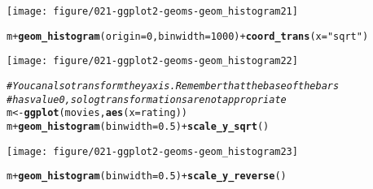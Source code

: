 \documentclass[a4paper,titlepage]{tufte-handout}\usepackage[]{graphicx}\usepackage[]{color}
\makeatletter
\def\maxwidth{ %
  \ifdim\Gin@nat@width>\linewidth
    \linewidth
  \else
    \Gin@nat@width
  \fi
}
\newcommand{\hlnum}[1]{\textcolor[rgb]{0.686,0.059,0.569}{#1}}%
\newcommand{\hlstr}[1]{\textcolor[rgb]{0.192,0.494,0.8}{#1}}%
\newcommand{\hlcom}[1]{\textcolor[rgb]{0.678,0.584,0.686}{\textit{#1}}}%
\newcommand{\hlopt}[1]{\textcolor[rgb]{0,0,0}{#1}}%
\newcommand{\hlstd}[1]{\textcolor[rgb]{0.345,0.345,0.345}{#1}}%
\newcommand{\hlkwb}[1]{\textcolor[rgb]{0.69,0.353,0.396}{#1}}%
\newcommand{\hlkwc}[1]{\textcolor[rgb]{0.333,0.667,0.333}{#1}}%
\newcommand{\hlkwd}[1]{\textcolor[rgb]{0.737,0.353,0.396}{\textbf{#1}}}%
\newenvironment{kframe}{%
 \def\at@end@of@kframe{}%
 \ifinner\ifhmode%
  \def\at@end@of@kframe{\end{minipage}}%
  \begin{minipage}{\columnwidth}%
 \fi\fi%
 \def\FrameCommand##1{\hskip\@totalleftmargin \hskip-\fboxsep
 \colorbox{shadecolor}{##1}\hskip-\fboxsep
     \hskip-\linewidth \hskip-\@totalleftmargin \hskip\columnwidth}%
 \MakeFramed {\advance\hsize-\width
   \@totalleftmargin\z@ \linewidth\hsize
   \@setminipage}}%
 {\par\unskip\endMakeFramed%
 \at@end@of@kframe}
\newenvironment{knitrout}{}{} %
\makeatother
\begin{document}
\begin{knitrout}
\begin{kframe}
{\ttfamily\noindent\itshape\color{messagecolor}{\#\# stat\_bin: binwidth defaulted to range/30. Use 'binwidth = x' to adjust this.}}\end{kframe}
\texttt{[image: figure/021-ggplot2-geoms-geom\_histogram21]} 
\begin{kframe}\begin{alltt}
\hlstd{m} \hlopt{+} \hlkwd{geom_histogram}\hlstd{(}\hlkwc{origin} \hlstd{=} \hlnum{0}\hlstd{,} \hlkwc{binwidth} \hlstd{=} \hlnum{1000}\hlstd{)} \hlopt{+} \hlkwd{coord_trans}\hlstd{(}\hlkwc{x} \hlstd{=} \hlstr{"sqrt"}\hlstd{)}
\end{alltt}
\end{kframe}
\texttt{[image: figure/021-ggplot2-geoms-geom\_histogram22]} 
\begin{kframe}\begin{alltt}
\hlcom{# You can also transform the y axis.  Remember that the base of the bars}
\hlcom{# has value 0, so log transformations are not appropriate}
\hlstd{m} \hlkwb{<-} \hlkwd{ggplot}\hlstd{(movies,} \hlkwd{aes}\hlstd{(}\hlkwc{x} \hlstd{= rating))}
\hlstd{m} \hlopt{+} \hlkwd{geom_histogram}\hlstd{(}\hlkwc{binwidth} \hlstd{=} \hlnum{0.5}\hlstd{)} \hlopt{+} \hlkwd{scale_y_sqrt}\hlstd{()}
\end{alltt}
\end{kframe}
\texttt{[image: figure/021-ggplot2-geoms-geom\_histogram23]} 
\begin{kframe}\begin{alltt}
\hlstd{m} \hlopt{+} \hlkwd{geom_histogram}\hlstd{(}\hlkwc{binwidth} \hlstd{=} \hlnum{0.5}\hlstd{)} \hlopt{+} \hlkwd{scale_y_reverse}\hlstd{()}
\end{alltt}



\end{kframe}
\end{knitrout}
\end{document}
